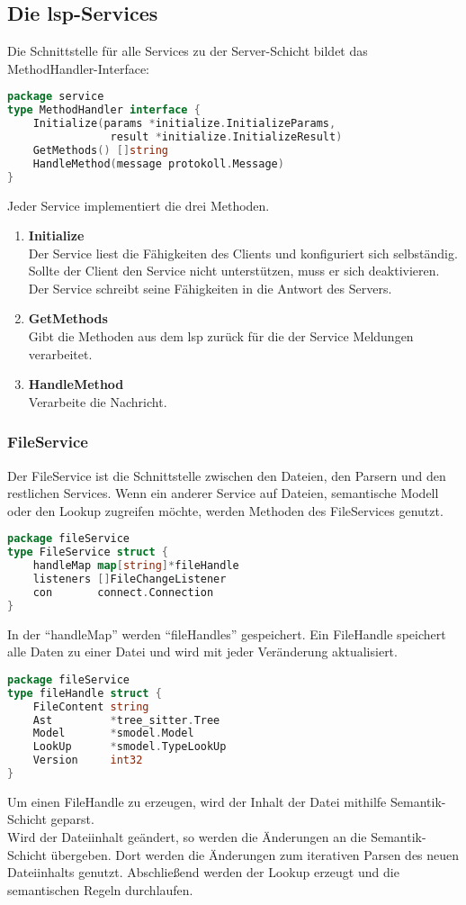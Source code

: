\documentclass[./einleitung.tex]{subfiles}
\begin{document}
    \subsection{Die \acrshort{lsp}-Services}
    Die Schnittstelle für alle Services zu der Server-Schicht bildet das MethodHandler-Interface:
    \begin{lstlisting}[language=Go]
package service
type MethodHandler interface {
	Initialize(params *initialize.InitializeParams,
                result *initialize.InitializeResult)
	GetMethods() []string
	HandleMethod(message protokoll.Message)
}
    \end{lstlisting}
    Jeder Service implementiert die drei Methoden.
    \begin{enumerate}
        \item \textbf{Initialize} \\
        Der Service liest die Fähigkeiten des Clients und konfiguriert sich selbständig.
        Sollte der Client den Service nicht unterstützen, muss er sich deaktivieren.
        Der Service schreibt seine Fähigkeiten in die Antwort des Servers.
        \item \textbf{GetMethods} \\
        Gibt die Methoden aus dem \acrshort{lsp} zurück für die der Service Meldungen verarbeitet.
        \item \textbf{HandleMethod} \\
        Verarbeite die Nachricht.
    \end{enumerate}


    \subsubsection{FileService}
    Der FileService ist die Schnittstelle zwischen den Dateien, den Parsern und den restlichen Services.
    Wenn ein anderer Service auf Dateien, semantische Modell oder den Lookup zugreifen möchte, werden Methoden des FileServices genutzt.
    \begin{lstlisting}[language=Go]
package fileService
type FileService struct {
	handleMap map[string]*fileHandle
	listeners []FileChangeListener
	con       connect.Connection
}
    \end{lstlisting}
    In der ``handleMap'' werden ``fileHandles'' gespeichert.
    Ein FileHandle speichert alle Daten zu einer Datei und wird mit jeder Veränderung aktualisiert.
    \begin{lstlisting}[language=Go]
package fileService
type fileHandle struct {
	FileContent string
	Ast         *tree_sitter.Tree
	Model       *smodel.Model
	LookUp      *smodel.TypeLookUp
	Version     int32
}
    \end{lstlisting}
    Um einen FileHandle zu erzeugen, wird der Inhalt der Datei mithilfe Semantik-Schicht geparst.\\
    Wird der Dateiinhalt geändert, so werden die Änderungen an die Semantik-Schicht übergeben.
    Dort werden die Änderungen zum iterativen Parsen des neuen Dateiinhalts genutzt.
    Abschließend werden der Lookup erzeugt und die semantischen Regeln durchlaufen. \\
\end{document}
